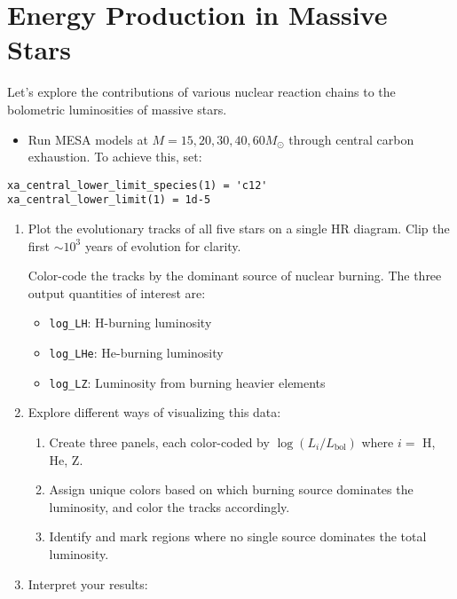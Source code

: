 \documentclass[11pt,a4paper]{article}
\begin{document}
\section{Energy Production in Massive Stars}

Let's explore the contributions of various nuclear reaction chains to the bolometric luminosities of massive stars.

\begin{itemize}
    \item Run MESA models at $M = 15, 20, 30, 40, 60 M_\odot$ through central carbon exhaustion.
    To achieve this, set:
\end{itemize}
    \begin{lstlisting}
xa_central_lower_limit_species(1) = 'c12'
xa_central_lower_limit(1) = 1d-5
    \end{lstlisting}

\begin{enumerate}
    \item Plot the evolutionary tracks of all five stars on a single HR diagram. 
    Clip the first $\sim 10^3$ years of evolution for clarity.

    Color-code the tracks by the dominant source of nuclear burning. The three output quantities of interest are:
    \begin{itemize}
        \item \texttt{log\_LH}: H-burning luminosity
        \item \texttt{log\_LHe}: He-burning luminosity
        \item \texttt{log\_LZ}: Luminosity from burning heavier elements
    \end{itemize}
    \item Explore different ways of visualizing this data:
    \begin{enumerate}[label=(\alph*)]
        \item Create three panels, each color-coded by $\log (L_i/L_{\text{bol}})$ where $i = $ H, He, Z.
        \item Assign unique colors based on which burning source dominates the luminosity, and color the tracks accordingly.
        \item Identify and mark regions where no single source dominates the total luminosity.
    \end{enumerate}

    \item Interpret your results: 

\end{enumerate}
\end{document}
